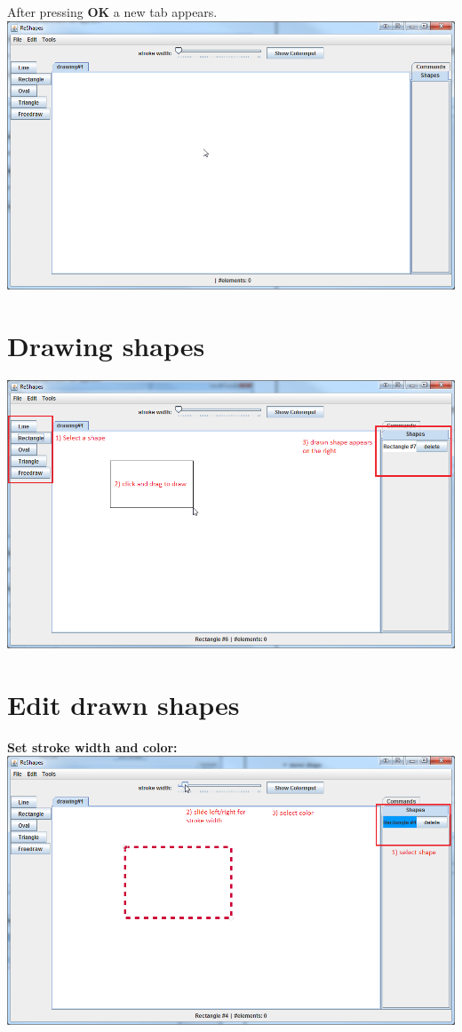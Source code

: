 \documentclass[12pt, accentcolor=tud9c, linedtoc, bigchapter, colorback, noresetcounter, numbersubsubsec]{tudreport}
\begin{document}
After pressing \textbf{OK} a new tab appears. \\
\includegraphics[width=1\textwidth]{img/add_new_tab_3} 

\section{Drawing shapes}

\includegraphics[width=1\textwidth]{img/drawing_shape}

\section{Edit drawn shapes}

\textbf{Set stroke width and color:} \\
\includegraphics[width=1\textwidth]{img/set_stroke} \\
\end{document}
